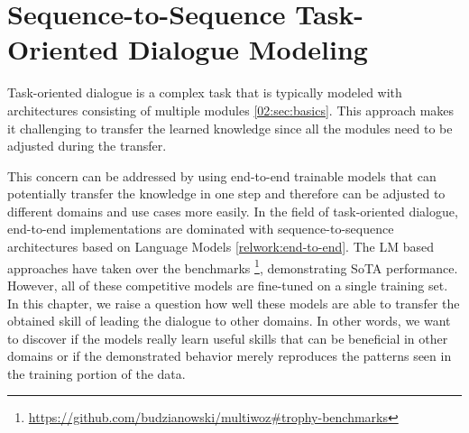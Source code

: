\chapter{Sequence-to-Sequence Task-Oriented Dialogue Modeling}
\label{chap:lm-tod}
Task-oriented dialogue is a complex task that is typically modeled with architectures consisting of multiple modules \ref{02:sec:basics}.
This approach makes it challenging to transfer the learned knowledge since all the modules need to be adjusted during the transfer.

This concern can be addressed by using end-to-end trainable models that can potentially transfer the knowledge in one step and therefore can be adjusted to different domains and use cases more easily.
In the field of task-oriented dialogue, end-to-end implementations are dominated with sequence-to-sequence architectures based on Language Models \ref{relwork:end-to-end}.
The LM based approaches have taken over the benchmarks \footnote{\url{https://github.com/budzianowski/multiwoz\#trophy-benchmarks}}, demonstrating SoTA performance.
However, all of these competitive models are fine-tuned on a single training set.
In this chapter, we raise a question how well these models are able to transfer the obtained skill of leading the dialogue to other domains.
In other words, we want to discover if the models really learn useful skills that can be beneficial in other domains or if the demonstrated behavior merely reproduces the patterns seen in the training portion of the data.

